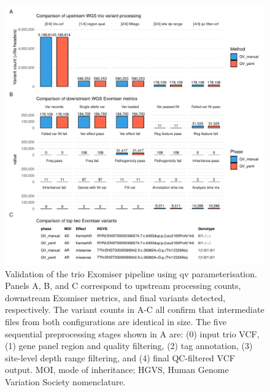 \begin{figure}[!t]
\centering
\includegraphics[width=\textwidth]{./images/qv_exomiser/exomiser_validation_bars_facet_metric.pdf}
\caption{Validation of the trio Exomiser pipeline using \ac{qv} parameterisation. Panels A, B, and C correspond to upstream processing counts, downstream Exomiser metrics, and final variants detected, respectively. The variant counts in A-C all confirm that intermediate files from both configurations are identical in size. The five sequential preprocessing stages shown in A are: (0) input trio VCF, (1) gene panel region and quality filtering, (2) tag annotation, (3) site-level depth range filtering, and (4) final QC-filtered VCF output. MOI, mode of inheritance; HGVS, Human Genome Variation Society nomenclature.}
\label{fig:qv_exomiser_validation}
\end{figure}


